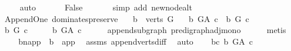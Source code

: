\begin{isabellebody}
\ \ \ \ \isamarkupfalse%
\ auto\ \isanewline
\ \ \isamarkupfalse%
\ \isamarkupfalse%
\ False\ \isanewline
\ \ \ \ \isamarkupfalse%
\ {\isacharparenleft}{\kern0pt}simp\ add{\isacharcolon}{\kern0pt}\ new{\isacharunderscore}{\kern0pt}node{\isacharunderscore}{\kern0pt}alt{\isacharparenright}{\kern0pt}\ \isanewline
{}\isamarkupfalse%
%
\endisatagproof
{\isafoldproof}%
%
\isadelimproof
\isanewline
%
\endisadelimproof
\isanewline
{}\isamarkupfalse%
\ {\isacharparenleft}{\kern0pt}\ Append{\isacharunderscore}{\kern0pt}One{\isacharparenright}{\kern0pt}\ dominates{\isacharunderscore}{\kern0pt}preserve{\isacharcolon}{\kern0pt}\isanewline
\ \ \ {\isachardoublequoteopen}b\ {\isasymin}\ verts\ G{\isachardoublequoteclose}\isanewline
\ \ \ {\isachardoublequoteopen}b\ {\isasymrightarrow}\isactrlbsub G{\isacharunderscore}{\kern0pt}A\isactrlesub \ c\ {\isasymlongleftrightarrow}\ b\ {\isasymrightarrow}\isactrlbsub G\isactrlesub \ c{\isachardoublequoteclose}\isanewline
%
\isadelimproof
%
\endisadelimproof
%
\isatagproof
{}\isamarkupfalse%
\ \ \isanewline
\ \ \isamarkupfalse%
\ {\isachardoublequoteopen}\ b\ {\isasymrightarrow}\isactrlbsub G\isactrlesub \ c{\isachardoublequoteclose}\isanewline
\ \ \isamarkupfalse%
\ \isamarkupfalse%
\ {\isachardoublequoteopen}b\ {\isasymrightarrow}\isactrlbsub G{\isacharunderscore}{\kern0pt}A\isactrlesub \ c{\isachardoublequoteclose}\isanewline
\ \ \ \ \isamarkupfalse%
\ append{\isacharunderscore}{\kern0pt}subgraph\ pre{\isacharunderscore}{\kern0pt}digraph{\isachardot}{\kern0pt}adj{\isacharunderscore}{\kern0pt}mono\isanewline
\ \ \ \ \isamarkupfalse%
\ metis\isanewline
{}\isamarkupfalse%
\ \isanewline
\ \ \isamarkupfalse%
\ b{\isacharunderscore}{\kern0pt}napp\ {\isacharcolon}{\kern0pt}\ {\isachardoublequoteopen}b\ {\isasymnoteq}\ app{\isachardoublequoteclose}\ \isamarkupfalse%
\ assms{\isacharparenleft}{\kern0pt}{}{\isacharparenright}{\kern0pt}\ append{\isacharunderscore}{\kern0pt}verts{\isacharunderscore}{\kern0pt}diff\ \isamarkupfalse%
\ auto\isanewline
\ \ \isamarkupfalse%
\ bc{\isacharcolon}{\kern0pt}\ {\isachardoublequoteopen}b\ {\isasymrightarrow}\isactrlbsub G{\isacharunderscore}{\kern0pt}A\isactrlesub \ c{\isachardoublequoteclose}\ \isanewline
\ \ \isamarkupfalse%
\ \isamarkupfalse%

\end{isabellebody}

